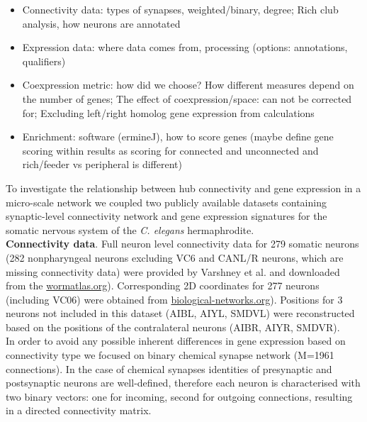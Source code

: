 \documentclass[10pt,letterpaper]{article}
\begin{document}
\begin{itemize}
    \item{Connectivity data: types of synapses, weighted/binary, degree; Rich club analysis, how neurons are annotated}
    \item{Expression data: where data comes from, processing (options: annotations, qualifiers)}
    \item{Coexpression metric: how did we choose? How different measures depend on the number of genes; The effect of coexpression/space: can not be corrected for; Excluding left/right homolog gene expression from calculations}
    \item{Enrichment: software (ermineJ), how to score genes (maybe define gene scoring within results as scoring for connected and unconnected and rich/feeder vs peripheral is different)}
    
\end{itemize}    
To investigate the relationship between hub connectivity and gene expression in a micro-scale network we coupled two publicly available datasets containing synaptic-level connectivity network and gene expression signatures for the somatic nervous system of the \textit{C. elegans} hermaphrodite.\\

\textbf{Connectivity data}. Full neuron level connectivity data for 279 somatic neurons (282 nonpharyngeal neurons excluding VC6 and CANL/R neurons, which are missing connectivity data) were provided by Varshney et al. \cite{Varshney2011} and downloaded from the  \href{http://www.wormatlas.org/neuronalwiring.html#NeuronalconnectivityII}{wormatlas.org}). 
Corresponding 2D coordinates for 277 neurons (including VC06) were obtained from \href{www.biological-networks.org/?page_id=25}{biological-networks.org}). 
Positions for 3 neurons not included in this dataset (AIBL, AIYL, SMDVL) were reconstructed based on the positions of the contralateral neurons (AIBR, AIYR, SMDVR).  \\ 
In order to avoid any possible inherent differences in gene expression based on connectivity type we focused on binary chemical synapse network (M=1961 connections).
In the case of chemical synapses identities of presynaptic and postsynaptic neurons are well-defined, therefore each neuron is characterised with two binary vectors: one for incoming, second for outgoing connections, resulting in a directed connectivity matrix.
\end{document}
